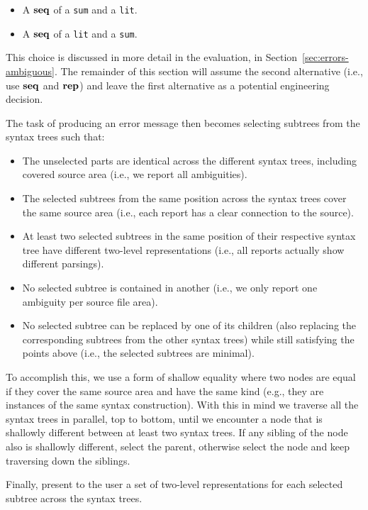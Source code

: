 \documentclass{kththesis}
\begin{document}
\begin{itemize}
  \item A $\mathrel{\mathbf{seq}}$ of a \texttt{sum} and a \texttt{lit}.
  \item A $\mathrel{\mathbf{seq}}$ of a \texttt{lit} and a \texttt{sum}.
\end{itemize}

This choice is discussed in more detail in the evaluation, in Section~\ref{sec:errors-ambiguous}. The remainder of this section will assume the second alternative (i.e., use $\mathrel{\mathbf{seq}}$ and $\mathrel{\mathbf{rep}}$) and leave the first alternative as a potential engineering decision.

The task of producing an error message then becomes selecting subtrees from the syntax trees such that:

\begin{itemize}
  \item The unselected parts are identical across the different syntax trees, including covered source area (i.e., we report all ambiguities).
  \item The selected subtrees from the same position across the syntax trees cover the same source area (i.e., each report has a clear connection to the source).
  \item At least two selected subtrees in the same position of their respective syntax tree have different two-level representations (i.e., all reports actually show different parsings).
  \item No selected subtree is contained in another (i.e., we only report one ambiguity per source file area).
  \item No selected subtree can be replaced by one of its children (also replacing the corresponding subtrees from the other syntax trees) while still satisfying the points above (i.e., the selected subtrees are minimal).
\end{itemize}

To accomplish this, we use a form of shallow equality where two nodes are equal if they cover the same source area and have the same kind (e.g., they are instances of the same syntax construction). With this in mind we traverse all the syntax trees in parallel, top to bottom, until we encounter a node that is shallowly different between at least two syntax trees. If any sibling of the node also is shallowly different, select the parent, otherwise select the node and keep traversing down the siblings.

Finally, present to the user a set of two-level representations for each selected subtree across the syntax trees.
\end{document}
